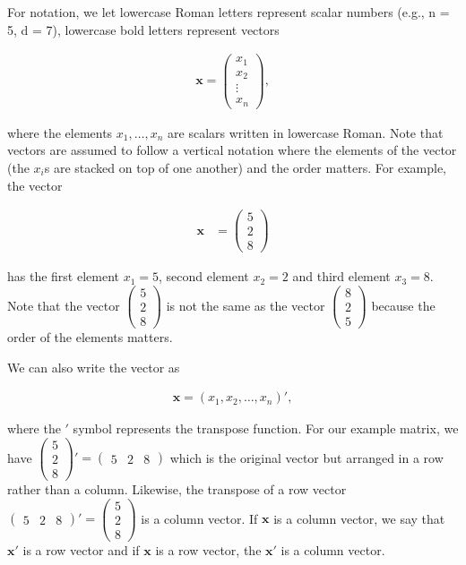 \documentclass[
]{book}
\theoremstyle{definition}
\theoremstyle{definition}
\theoremstyle{definition}
\theoremstyle{definition}
\theoremstyle{remark}
\begin{document}
For notation, we let lowercase Roman letters represent scalar numbers (e.g., n = 5, d = 7), lowercase bold letters represent vectors

\[
\begin{aligned}
\textbf{x} = \begin{pmatrix}  x_1 \\ x_2 \\ \vdots \\ x_n \end{pmatrix},
\end{aligned}
\]

where the elements \(x_1, \ldots, x_n\) are scalars written in lowercase Roman. Note that vectors are assumed to follow a vertical notation where the elements of the vector (the \(x_i\)s are stacked on top of one another) and the order matters. For example, the vector

\[
\begin{aligned}
\mathbf{x} & = \begin{pmatrix} 5 \\ 2 \\ 8 \end{pmatrix}
\end{aligned}
\]

has the first element \(x_1 = 5\), second element \(x_2 = 2\) and third element \(x_3 = 8\). Note that the vector \(\begin{pmatrix} 5 \\ 2 \\ 8 \end{pmatrix}\) is not the same as the vector \(\begin{pmatrix} 8 \\ 2 \\ 5 \end{pmatrix}\) because the order of the elements matters.

We can also write the vector as

\[
\begin{aligned}
\textbf{x} = \left(  x_1, x_2, \ldots, x_n \right)',
\end{aligned}
\]

where the \('\) symbol represents the transpose function. For our example matrix, we have \(\begin{pmatrix} 5 \\ 2 \\ 8 \end{pmatrix}' = \begin{pmatrix} 5 & 2 & 8 \end{pmatrix}\) which is the original vector but arranged in a row rather than a column. Likewise, the transpose of a row vector \(\begin{pmatrix} 5 & 2 & 8 \end{pmatrix}' = \begin{pmatrix} 5 \\ 2 \\ 8 \end{pmatrix}\) is a column vector. If \(\mathbf{x}\) is a column vector, we say that \(\mathbf{x}'\) is a row vector and if \(\mathbf{x}\) is a row vector, the \(\mathbf{x}'\) is a column vector.
\end{document}
